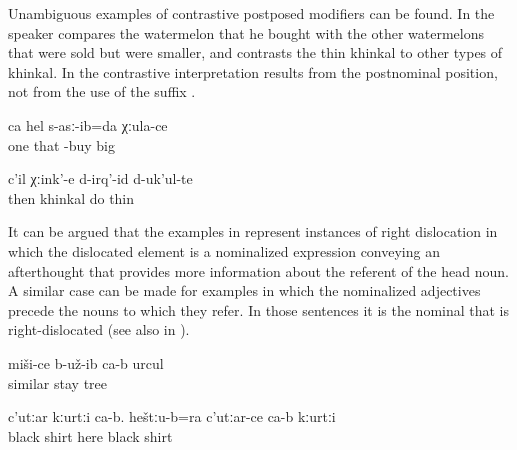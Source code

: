 Unambiguous examples of contrastive postposed modifiers can be found. In  the speaker compares the watermelon that he bought with the other watermelons that were sold but were smaller, and  contrasts the thin khinkal to other types of khinkal. In  the contrastive interpretation results from the postnominal position, not from the use of the suffix . 
%
\begin{exe}

	\ex	\label{ex:‎‎I took one, a big one}
	\gll	ca	hel	s-asː-ib=da	χːula-ce\\
		one	that	-buy	big\\
	\glt	{} 

		\ex	\label{ex:Then we make khinkal, the thin one}
		\gll	c'il	χːink'-e	d-irq'-id	d-uk'ul-te\\
			then	khinkal	do	thin\\
		\glt	{}
		
\end{exe}


It can be argued that the examples in  represent instances of right dislocation in which the dislocated element is a nominalized expression conveying an afterthought that provides more information about the referent of the head noun. A similar case can be made for examples in which the nominalized adjectives precede the nouns to which they refer. In those sentences it is the nominal that is right-dislocated  (see also  in ).
%
\begin{exe}
	\ex	\label{ex:There turned out to be a similar tree@20a}
	\gll	miši-ce	b-už-ib	ca-b	urcul\\
		similar	stay		tree\\
	\glt	{}

	\ex	\label{ex:This is a black shirt. And here this is also a black shirt@20b}
	\gll	c'utːar	kːurtːi	ca-b.	heštːu-b=ra	c'utːar-ce	ca-b	kːurtːi\\
		black	shirt		here	black		shirt\\
	\glt	{}
\end{exe}

